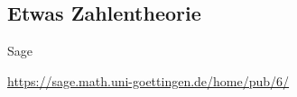 \documentclass[hyperref={xetex}]{beamer}
\begin{document}
\subsection{Etwas Zahlentheorie}
\begin{frame}[fragile]{Sage}
\begin{center}
\url{https://sage.math.uni-goettingen.de/home/pub/6/}
\end{center}
\end{frame}
%
%
\end{document}
